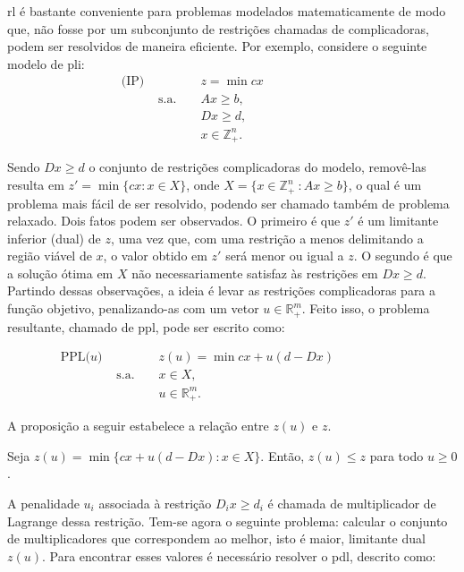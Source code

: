\gls{rl} é bastante conveniente para problemas modelados matematicamente de modo
que, não fosse por um subconjunto de restrições chamadas de complicadoras, podem
ser resolvidos de maneira eficiente. Por exemplo, considere o seguinte modelo de
\gls{pli}:
\begin{align*}
    \text{(IP) } & & & z = \min cx & & & & & & & & \\
    &\text{s.a. } & & Ax \geq b, & & & & & & & & \\
    & & & Dx \geq d, & & & & & & & & \\
    & & & x \in \mathbb{Z}^n_+. & & & & & & & &
\end{align*}

Sendo $Dx  \geq d$ o  conjunto de restrições complicadoras  do modelo,
removê-las resulta em $z' = \min \{cx :  x \in X\}$, onde $X = \{x \in
\mathbb{Z}^n_+\ : Ax \geq b\}$, o qual é um problema mais fácil de ser
resolvido,  podendo ser  chamado  também de  problema relaxado.   Dois
fatos  podem ser  observados. O  primeiro é  que $z'$  é um  limitante
inferior  (dual) de  $z$,  uma  vez que,  com  uma  restrição a  menos
delimitando a região viável de $x$,  o valor obtido em $z'$ será menor
ou  igual  a  $z$.  O  segundo  é  que  a  solução ótima  em  $X$  não
necessariamente  satisfaz  às restrições  em  $Dx  \geq d$.   Partindo
dessas observações, a ideia é levar as restrições complicadoras para a
função objetivo, penalizando-as com um vetor $u \in \mathbb{R}^{m}_+$.
Feito  isso, o  problema resultante,  chamado de  \gls{ppl}, pode  ser
escrito como:

\begin{align*}
    \text{PPL($u$) } & & & z(u) = \min cx  + u(d - Dx) & & & & & & & \\
    & \text{s.a. } & & x \in X, & & & & & & & \\
    & & & u \in \mathbb{R}^m_+. & & & & & & &
\end{align*}

A proposição a seguir estabelece a relação entre $z(u)$ e $z$.
\begin{proposition}
Seja $z(u) = \min \{cx  + u (d - Dx) : x \in  X\} $. Então, $z(u) \leq
z$ para todo $u \geq 0$.
\end{proposition}
A penalidade $u_i$ associada à restrição  $D_ix \geq d_i$ é chamada de
multiplicador de  Lagrange dessa  restrição.  Tem-se agora  o seguinte
problema: calcular  o conjunto de multiplicadores  que correspondem ao
melhor, isto  é maior,  limitante dual  $z(u)$.  Para  encontrar esses
valores é necessário resolver o \gls{pdl}, descrito como:

